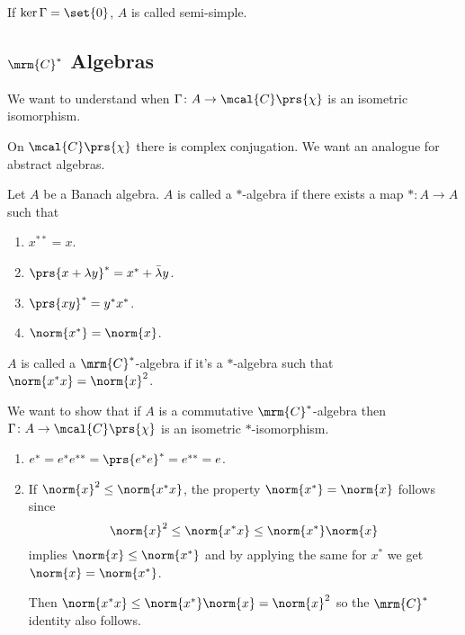 \documentclass[10pt, twoside]{book}
\begin{document}
\begin{definition}
If $\ker \Gamma = \set{0}$, $A$ is called semi-simple.
\end{definition}

\subsection{$\mrm{C}^*$ Algebras}

We want to understand when $\Gamma \colon A \to \mcal{C}\prs{\chi}$ is an isometric isomorphism.

On $\mcal{C}\prs{\chi}$ there is complex conjugation. We want an analogue for abstract algebras.

\begin{definition}[$*$-Algebra]
Let $A$ be a Banach algebra. $A$ is called a $*$-algebra if there exists a map $* \colon A \to A$ such that
\begin{enumerate}
\item $x^{**} = x$.
\item $\prs{x+\lambda y}^* = x^* + \bar{\lambda} y$.
\item $\prs{xy}^* = y^* x^*$.
\item $\norm{x^*} = \norm{x}$.
\end{enumerate}
\end{definition}

\begin{definition}
$A$ is called a $\mrm{C}^*$-algebra if it's a $*$-algebra such that $\norm{x^* x} = \norm{x}^2$.
\end{definition}

We want to show that if $A$ is a commutative $\mrm{C}^*$-algebra then $\Gamma \colon A \to \mcal{C}\prs{\chi}$ is an isometric $*$-isomorphism.

\begin{remark}
\begin{enumerate}
\item $e^* = e^* e^{**} = \prs{e^* e}^* = e^{**} = e$.
\item If $\norm{x}^2 \leq \norm{x^* x}$, the property $\norm{x^*} = \norm{x}$ follows
since
\[\norm{x}^2 \leq \norm{x^* x} \leq \norm{x^*} \norm{x}\]
implies $\norm{x} \leq \norm{x^*}$ and by applying the same for $x^*$ we get $\norm{x} = \norm{x^*}$.

Then $\norm{x^* x} \leq \norm{x^*} \norm{x} = \norm{x}^2$ so the $\mrm{C}^*$ identity also follows. 
\end{enumerate}
\end{remark}
\end{document}
